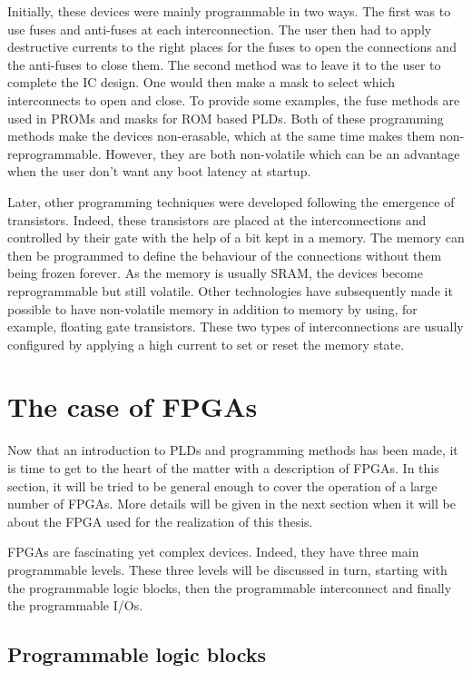 Initially, these devices were mainly programmable in two ways. The first was to use fuses and 
anti-fuses at each interconnection. The user then had to apply destructive currents to the right 
places for the fuses to open the connections and the anti-fuses to close them. The second method was 
to leave it to the user to complete the IC design. One would then make a mask to select which 
interconnects to open and close. To provide some examples, the fuse methods are used in PROMs and 
masks for ROM based PLDs. Both of these programming methods make the devices non-erasable, which at 
the same time makes them non-reprogrammable. However, they are both non-volatile which can be an 
advantage when the user don't want any boot latency at startup.

Later, other programming techniques were developed following the emergence of transistors. Indeed, 
these transistors are placed at the interconnections and controlled by their gate with the help of 
a bit kept in a memory. The memory can then be programmed to define the behaviour of the connections 
without them being frozen forever. As the memory is usually SRAM, the devices become reprogrammable
but still volatile. Other technologies have subsequently made it possible to have non-volatile 
memory in addition to memory by using, for example, floating gate transistors. These two types of 
interconnections are usually configured by applying a high current to set or reset the memory state. 

\section{The case of FPGAs}

Now that an introduction to PLDs and programming methods has been made, it is time to get to the 
heart of the matter with a description of FPGAs. In this section, it will be tried to be general 
enough to cover the operation of a large number of FPGAs. More details will be given in the next 
section when it will be about the FPGA used for the realization of this thesis.

FPGAs are fascinating yet complex devices. Indeed, they have three main programmable levels. These 
three levels will be discussed in turn, starting with the programmable logic blocks, then the 
programmable interconnect and finally the programmable I/Os. 

\subsection{Programmable logic blocks}

